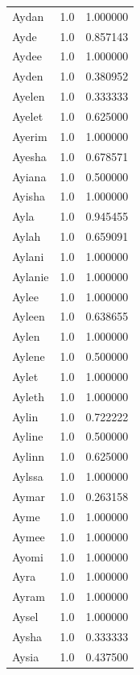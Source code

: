 \documentclass[
  letterpaper,
  DIV=11,
  numbers=noendperiod]{scrreprt}
\begin{document}
\begin{tabular}{lrr}
Aydan           &   1.0 &   1.000000 \\
Ayde            &   1.0 &   0.857143 \\
Aydee           &   1.0 &   1.000000 \\
Ayden           &   1.0 &   0.380952 \\
Ayelen          &   1.0 &   0.333333 \\
Ayelet          &   1.0 &   0.625000 \\
Ayerim          &   1.0 &   1.000000 \\
Ayesha          &   1.0 &   0.678571 \\
Ayiana          &   1.0 &   0.500000 \\
Ayisha          &   1.0 &   1.000000 \\
Ayla            &   1.0 &   0.945455 \\
Aylah           &   1.0 &   0.659091 \\
Aylani          &   1.0 &   1.000000 \\
Aylanie         &   1.0 &   1.000000 \\
Aylee           &   1.0 &   1.000000 \\
Ayleen          &   1.0 &   0.638655 \\
Aylen           &   1.0 &   1.000000 \\
Aylene          &   1.0 &   0.500000 \\
Aylet           &   1.0 &   1.000000 \\
Ayleth          &   1.0 &   1.000000 \\
Aylin           &   1.0 &   0.722222 \\
Ayline          &   1.0 &   0.500000 \\
Aylinn          &   1.0 &   0.625000 \\
Aylssa          &   1.0 &   1.000000 \\
Aymar           &   1.0 &   0.263158 \\
Ayme            &   1.0 &   1.000000 \\
Aymee           &   1.0 &   1.000000 \\
Ayomi           &   1.0 &   1.000000 \\
Ayra            &   1.0 &   1.000000 \\
Ayram           &   1.0 &   1.000000 \\
Aysel           &   1.0 &   1.000000 \\
Aysha           &   1.0 &   0.333333 \\
Aysia           &   1.0 &   0.437500 \\

\end{tabular}
\end{document}
